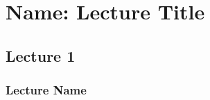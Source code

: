 \newpage
\section{Name: Lecture Title}
\subsection{Lecture 1}
\subsubsection{Lecture Name}




















































